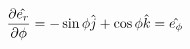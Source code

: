 \begin{equation}
  \pdv{\hat{e_r}}{\phi} = 
  - \sin\phi\hat{j} 
  + \cos\phi\hat{k} = \hat{e_\phi}
\end{equation}
